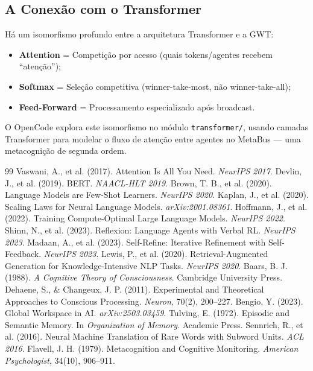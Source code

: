 \subsection{A Conexão com o Transformer}

Há um isomorfismo profundo entre a arquitetura Transformer e a GWT:

\begin{itemize}
    \item \textbf{Attention} = Competição por acesso (quais tokens/agentes recebem ``atenção'');
    \item \textbf{Softmax} = Seleção competitiva (winner-take-most, não winner-take-all);
    \item \textbf{Feed-Forward} = Processamento especializado após broadcast.
\end{itemize}

O OpenCode explora este isomorfismo no módulo \texttt{transformer/}, usando camadas Transformer para modelar o fluxo de atenção entre agentes no MetaBus — uma metacognição de segunda ordem.

\begin{thebibliography}{99}
 Vaswani, A., et al. (2017). Attention Is All You Need. \textit{NeurIPS 2017}. 
 Devlin, J., et al. (2019). BERT. \textit{NAACL-HLT 2019}. 
 Brown, T. B., et al. (2020). Language Models are Few-Shot Learners. \textit{NeurIPS 2020}. 
 Kaplan, J., et al. (2020). Scaling Laws for Neural Language Models. \textit{arXiv:2001.08361}. 
 Hoffmann, J., et al. (2022). Training Compute-Optimal Large Language Models. \textit{NeurIPS 2022}. 
 Shinn, N., et al. (2023). Reflexion: Language Agents with Verbal RL. \textit{NeurIPS 2023}. 
 Madaan, A., et al. (2023). Self-Refine: Iterative Refinement with Self-Feedback. \textit{NeurIPS 2023}. 
 Lewis, P., et al. (2020). Retrieval-Augmented Generation for Knowledge-Intensive NLP Tasks. \textit{NeurIPS 2020}. 
 Baars, B. J. (1988). \textit{A Cognitive Theory of Consciousness}. Cambridge University Press.
 Dehaene, S., \& Changeux, J. P. (2011). Experimental and Theoretical Approaches to Conscious Processing. \textit{Neuron}, 70(2), 200--227. 
 Bengio, Y. (2023). Global Workspace in AI. \textit{arXiv:2503.03459}.
 Tulving, E. (1972). Episodic and Semantic Memory. In \textit{Organization of Memory}. Academic Press.
 Sennrich, R., et al. (2016). Neural Machine Translation of Rare Words with Subword Units. \textit{ACL 2016}. 
 Flavell, J. H. (1979). Metacognition and Cognitive Monitoring. \textit{American Psychologist}, 34(10), 906--911. 
\end{thebibliography}
